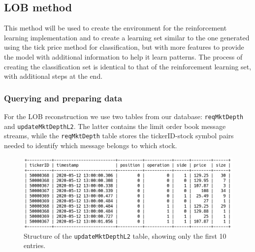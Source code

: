 \documentclass[a4paper,oneside,onecolumn,12pt]{book}
\begin{document}
	\subsection{LOB method}
    This method will be used to create the environment for the reinforcement learning implementation and to create a learning set similar to the one generated using the tick price method for classification, but with more features to provide the model with additional information to help it learn patterns. The process of creating the classification set is identical to that of the reinforcement learning set, with additional steps at the end.
		\subsubsection{Querying and preparing data} 
			For the LOB reconstruction we use two tables from our database: \texttt{reqMktDepth} and \texttt{updateMktDepthL2}. The latter contains the limit order book message streams, while the \texttt{reqMktDepth} table stores the tickerID-stock symbol pairs needed to identify which message belongs to which stock.

			\begin{figure}[H]
			\begin{center}
				\includegraphics[width=\linewidth]{kep/updateMktDepthL2.png}
				\caption{Structure of the \texttt{updateMktDepthL2} table, showing only the first 10 entries.}
				\label{fig:updateMktDepthL2}
			\end{center}
			\end{figure}
\end{document}
